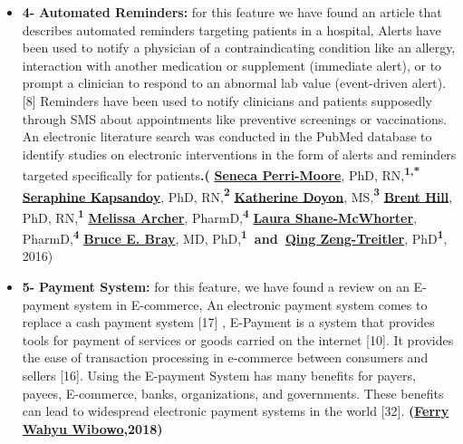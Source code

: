 \documentclass{article}
\begin{document}
\begin{itemize}
        \item \textbf{4- }\textbf{Automated Reminders: }for this feature we have found an article that describes automated reminders targeting patients in a hospital, Alerts have been used to notify a physician of a contraindicating condition like an allergy, interaction with another medication or supplement (immediate alert), or to prompt a clinician to respond to an abnormal lab value (event-driven alert).[8] Reminders have been used to notify clinicians and patients supposedly through SMS about appointments like preventive screenings or vaccinations. An electronic literature search was conducted in the PubMed database to identify studies on electronic interventions in the form of alerts and reminders targeted specifically for patients\textbf{.(} \href{https://pubmed.ncbi.nlm.nih.gov/?term=Perri-Moore\%20S\%5BAuthor\%5D}{\textbf{Seneca Perri-Moore}}, PhD, RN,\textbf{\textsuperscript{1,*}} \href{https://pubmed.ncbi.nlm.nih.gov/?term=Kapsandoy\%20S\%5BAuthor\%5D}{\textbf{Seraphine Kapsandoy}}, PhD, RN,\textbf{\textsuperscript{2}} \href{https://pubmed.ncbi.nlm.nih.gov/?term=Doyon\%20K\%5BAuthor\%5D}{\textbf{Katherine Doyon}}, MS,\textbf{\textsuperscript{3}} \href{https://pubmed.ncbi.nlm.nih.gov/?term=Hill\%20B\%5BAuthor\%5D}{\textbf{Brent Hill}}, PhD, RN,\textbf{\textsuperscript{1}} \href{https://pubmed.ncbi.nlm.nih.gov/?term=Archer\%20M\%5BAuthor\%5D}{\textbf{Melissa Archer}}, PharmD,\textbf{\textsuperscript{4}} \href{https://pubmed.ncbi.nlm.nih.gov/?term=Shane-McWhorter\%20L\%5BAuthor\%5D}{\textbf{Laura Shane-McWhorter}}, PharmD,\textbf{\textsuperscript{4}} \href{https://pubmed.ncbi.nlm.nih.gov/?term=Bray\%20BE\%5BAuthor\%5D}{\textbf{Bruce E. Bray}}, MD, PhD,\textbf{\textsuperscript{1}}\textbf{ and }\href{https://pubmed.ncbi.nlm.nih.gov/?term=Zeng-Treitler\%20Q\%5BAuthor\%5D}{\textbf{Qing Zeng-Treitler}}, PhD\textbf{\textsuperscript{1}}, 2016)\pagebreak
        \item \textbf{5- }\textbf{Payment System:} for this feature, we have found a review on an E-payment system in E-commerce, An electronic payment system comes to replace a cash payment system [17] , E-Payment is a system that provides tools for payment of services or goods carried on the internet [10]. It provides the ease of transaction processing in e-commerce between consumers and sellers [16]. Using the E-payment System has many benefits for payers, payees, E-commerce, banks, organizations, and governments. These benefits can lead to widespread electronic payment systems in the world [32]. \textbf{(}\href{https://www.researchgate.net/profile/Ferry-Wibowo?_tp=eyJjb250ZXh0Ijp7ImZpcnN0UGFnZSI6InB1YmxpY2F0aW9uIiwicGFnZSI6InB1YmxpY2F0aW9uIn19}{\textbf{Ferry Wahyu Wibowo}}\textbf{,2018)}

\end{itemize}
\end{document}
